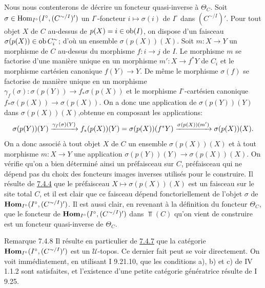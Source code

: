\documentclass[10pt]{../fichiers-configuration-latex/smfart}
\begin{document}
Nous nous contenterons de décrire un foncteur quasi-inverse à
$\Theta_C$. Soit \\ $\sigma \in \operatorname{Hom}_{I^{\circ}} (I^{\circ},
(C^{\sim/I})')$ \ie un $I^{\circ}$-foncteur $i \mapsto \sigma(i)$ de
$I^{\circ}$ dans $(C^{\sim/I})'$. Pour tout objet $X$ de $C$ au-dessus
de $p(X) = i \in \operatorname{ob} (I)$, on dispose d'un faisceau $\sigma(p(X)) \in
\operatorname{ob} C^{\sim}_i$; d'où un ensemble $\sigma (p(X)) (X)$. Soit $m : X \to
Y$ un morphisme de $C$ au-dessus du morphisme $f : i \to j$ de $I$. Le
morphisme $m$ se factorise d'une manière unique en un morphisme $m': X
\to f^{\ast} Y$ de $C_i$ et le morphisme cartésien canonique $f(Y) \to
Y$. De même le morphisme $\sigma(f)$ se factorise de manière unique en
un morphisme $\gamma_f(\sigma) : \sigma (p(Y)) \to f_{\ast} \sigma(p(X))$
et le morphisme $I^{\circ}$-cartésien canonique $f_{\ast} \sigma(p(X))
\to \sigma(p(X))$. On a donc une application de $\sigma(p(Y))(Y)$ dans
$\sigma(p(X))(X)$,\pageoriginale obtenue en composant les applications:
$$
\sigma(p(Y))(Y) \xrightarrow{\gamma_f(\sigma)(Y)} f_{\ast} (p(X))(Y) =
\sigma(p(X))(f^{\ast}Y) \xrightarrow{\sigma(p(X))(m')} \sigma(p(X))(X){}.
$$
On a donc associé à tout objet $X$ de $C$ un ensemble
$\sigma(p(X))(X)$ et à tout morphisme $m : X \to Y$ une application
$\sigma(p(Y))(Y) \to \sigma(p(X))(X)$. On vérifie qu'on a bien
déterminé ainsi un préfaisceau sur $C$, préfaisceau qui ne dépend pas
du choix des foncteurs images inverses utilisés pour le construire. Il
résulte de \hyperref[VI.prop7.4.4]{7.4.4} que le préfaisceau $X \mapsto \sigma(p(X))(X)$ est un
faisceau sur le site total $C$, et  il est clair que ce faisceau
dépend fonctoriellement de l'objet $\sigma$ de $\operatorname{\mathbf{Hom}}_{I^{\circ}}
(I^{\circ}, (C^{\sim/I})')$. Il est aussi clair, en revenant à la
définition du foncteur $\Theta_{C}$, que le foncteur de $\operatorname{\mathbf{Hom}}_{I^{\circ}}
(I^{\circ}, (C^{\sim/I})')$ dans $\Top(C)$ qu'on vient de construire
est un foncteur quasi-inverse de $\Theta_C$.

\begin{enonce*}[remark]{Remarque 7.4.8}
Il résulte en particulier de \hyperref[VI.prop7.4.7]{7.4.7} que la catégorie
$\operatorname{\mathbf{Hom}}_{I^{\circ}} (I^{\circ}, (C^{\sim/I})')$ est un
$𝒰$-topos. Ce dernier fait peut se voir directement. On voit
immédiatement, en utilisant I 9.21.10, que les conditions a), b) et
c) de IV 1.1.2 sont satisfaites, et l'existence d'une petite
catégorie génératrice résulte de I 9.25.
\end{enonce*}

\setcounter{subsubsection}{8}
\end{document}
